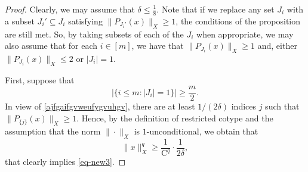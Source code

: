 \documentclass[11pt,leqno]{amsart}
\theoremstyle{remark}
\theoremstyle{plain}
\begin{document}
\begin{proof}
Clearly, we may assume that $\delta\leqslant \frac{1}{8}$. Note that if we replace any set $J_i$ with a subset $J_i' \subseteq J_i$
satisfying $\|P_{J_i'}(x)\|_X\geqslant 1$, the conditions of the proposition are still met. So, by taking subsets of each of the $J_i$
when appropriate, we may also assume that for each $i\in [m]$, we have that $\|P_{J_i}(x)\|_X\geqslant 1$ and,
either $\|P_{J_i}(x)\|_X\leqslant 2$ or $|J_i|=1$.

First, suppose that
$$ \big|\{i\leqslant m\colon |J_i|=1\}\big|\geqslant \frac{m}{2}. $$
In view of \eqref{ajfgaifgvweufygvuhgv}, there are at least $1/(2\delta)$
indices $j$ such that $\|P_{\{j\}}(x)\|_X\geqslant 1$. Hence, by the definition of restricted cotype
and the assumption that the norm $\|\cdot\|_X$ is $1$-unconditional, we obtain that
$$ \|x\|_X^q \geqslant \frac{1}{\mathrm{C}^q}\cdot \frac{1}{2\delta}, $$
that clearly implies \eqref{eq-new3}.


\end{proof}
\end{document}
